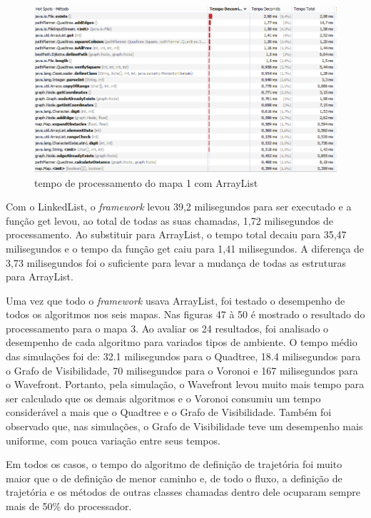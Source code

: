 \begin{figure}[h]
	\centering
	\label{fig46}
		\includegraphics[keepaspectratio=true,scale=0.6]{figuras/array.PNG}
	\caption{tempo de processamento do mapa 1 com ArrayList}
\end{figure}

Com o LinkedList, o \textit{framework} levou 39,2 milisegundos para ser executado e a função get levou, ao total de todas as suas chamadas, 1,72 milisegundos de processamento. Ao substituir para ArrayList, o tempo total decaiu para 35,47 milisegundos e o tempo da função get caiu para 1,41 milisegundos. A diferença de 3,73 milisegundos foi o suficiente para levar a mudança de todas as estruturas para ArrayList.

Uma vez que todo o \textit{framework} usava ArrayList, foi testado o desempenho de todos os algoritmos nos seis mapas. Nas figuras 47 à 50 é mostrado o resultado do processamento para o mapa 3. Ao avaliar os 24 resultados, foi analisado o desempenho de cada algoritmo para variados tipos de ambiente. O tempo médio das simulações foi de: 32.1 milisegundos para o Quadtree, 18.4 milisegundos para o Grafo de Visibilidade, 70 milisegundos para o Voronoi e 167 milisegundos para o Wavefront. Portanto, pela simulação, o Wavefront levou muito mais tempo para ser calculado que os demais algoritmos e o Voronoi consumiu um tempo considerável a mais que o Quadtree e o Grafo de Visibilidade. Também foi observado que, nas simulações, o Grafo de Visibilidade teve um desempenho mais uniforme, com pouca variação entre seus tempos.

Em todos os casos, o tempo do algoritmo de definição de trajetória foi muito maior que o de definição de menor caminho e, de todo o fluxo, a definição de trajetória e os métodos de outras classes chamadas dentro dele ocuparam sempre mais de 50\% do processador.

